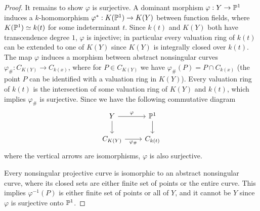\documentclass{article}
\begin{document}
\begin{enumerate} [label=\textbf{\arabic*.}, leftmargin=0cm]
\begin{proof}
  It remains to show $\varphi$ is surjective. A dominant morphism $\varphi : Y \to \mathbb{P}^1$ induces a $k$-homomorphism $\varphi^* : K(\mathbb{P}^1) \to K(Y)$ between function fields, where $K(\mathbb{P}^1) \simeq k(t)$ for some indeterminant $t$. Since $k(t)$ and $K(Y)$ both have transcendence degree $1$, $\varphi$ is injective; in particular every valuation ring of $k(t)$ can be extended to one of $K(Y)$ since $K(Y)$ is integrally closed over $k(t)$. The map $\varphi$ induces a morphism between abstract nonsingular curves $\varphi_\# : C_{K(Y)} \to C_{k(x)}$, where for $P \in C_{K(Y)}$ we have $\varphi_\# (P) = P \cap C_{k(x)}$ (the point $P$ can be identified with a valuation ring in $K(Y)$). Every valuation ring of $k(t)$ is the intersection of some valuation ring of $K(Y)$ and $k(t)$, which implies $\varphi_\#$ is surjective. Since we have the following commutative diagram
  \[ \begin{tikzcd}
    Y \arrow[d] \arrow[r, "\varphi"]  & \PP^1 \arrow[d] \\
    C_{K(Y)} \arrow[r, "\varphi_\#"'] & C_{k(t)}       
    \end{tikzcd} \]
  where the vertical arrows are isomorphisms, $\varphi$ is also surjective.

  Every nonsingular projective curve is isomorphic to an abstract nonsingular curve, where its closed sets are either finite set of points or the entire curve. This implies $\varphi^{-1}(P)$ is either finite set of points or all of $Y$, and it cannot be $Y$ since $\varphi$ is surjective onto $\mathbb{P}^1$.
\end{proof}

\end{enumerate}
\end{document}
